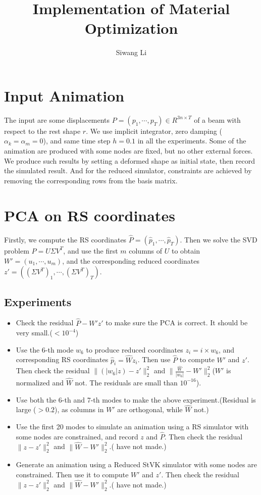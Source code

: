 \documentclass[twocolumn,a4paper]{article}
\author{Siwang Li}
\title{Implementation of Material Optimization}
\begin{document}
\maketitle

\section{Input Animation}
The input are some displacements $P = (p_1,\cdots,p_T) \in R^{3n\times T}$ of a
beam with respect to the rest shape $r$. We use implicit integrator, zero
damping ($\alpha_k=\alpha_m=0$), and same time step $h=0.1$ in all the
experiments. Some of the animation are produced with some nodes are fixed, but
no other external forces. We produce such results by setting a deformed shape as
initial state, then record the simulated result. And for the reduced simulator,
constraints are achieved by removing the corresponding rows from the basis
matrix.

\section{PCA on RS coordinates}
Firstly, we compute the RS coordinates $\hat{P} =
(\hat{p}_1,\cdots,\hat{p}_T)$.  Then we solve the SVD problem $\hat{P} = U\Sigma
V^T$, and use the first $m$ columns of $U$ to obtain $W' = (u_1,\cdots,u_m)$,
and the corresponding reduced coordinates $z' = ((\Sigma V^T)_1,\cdots,(\Sigma
V^T)_T)$.

\subsection{Experiments}
\begin{itemize}
\item Check the residual $\hat{P}-W'z'$ to make sure the PCA is correct. It
  should be very small.({\color{red}$<10^{-4}$})
\item Use the 6-th mode $w_6$ to produce reduced coordinates $z_i=i\times w_6$,
  and corresponding RS coordinates $\hat{p}_i=\hat{W}z_i$. Then use $\hat{P}$ to
  compute $W'$ and $z'$. Then check the residual $\|(|w_6|z)-z'\|_2^2$ and
  $\|\frac{\hat{W}}{|w_6|}-W'\|_2^2$({\color{red}$W'$ is normalized and
    $\hat{W}$ not. The residuals are small than $10^{-16}$}).
\item Use both the 6-th and 7-th modes to make the above
  experiment.({\color{red}Residual is large ($>0.2$), as columns in $W'$ are
    orthogonal, while $\hat{W}$ not.})
\item Use the first 20 modes to simulate an animation using a RS simulator with
  some nodes are constrained, and record $z$ and $\hat{P}$. Then check the
  residual $\|z-z'\|_2^2$ and $\|\hat{W}-W'\|_2^2$.({\color{red} have not made.})
\item Generate an animation using a Reduced StVK simulator with some nodes are
  constrained. Then use it to compute $W'$ and $z'$. Then check the residual
  $\|z-z'\|_2^2$ and $\|\hat{W}-W'\|_2^2$.({\color{red} have not made.})
\end{itemize}
\end{document}
